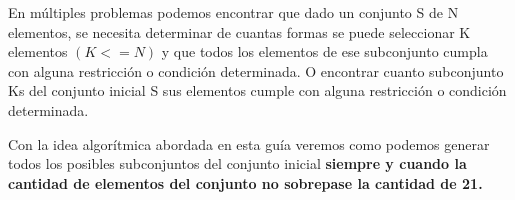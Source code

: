En múltiples problemas podemos encontrar que dado un conjunto S de N elementos, se necesita determinar de cuantas formas se puede seleccionar K elementos $ (K <= N) $ y que todos los elementos de ese subconjunto cumpla con alguna restricción o condición determinada. O encontrar cuanto subconjunto Ks del conjunto inicial S sus elementos cumple con alguna restricción o condición determinada.

Con la idea algorítmica abordada en esta guía veremos como podemos generar todos los posibles subconjuntos del conjunto inicial \textbf{siempre y cuando la cantidad de elementos del conjunto no sobrepase la cantidad de 21.} 
